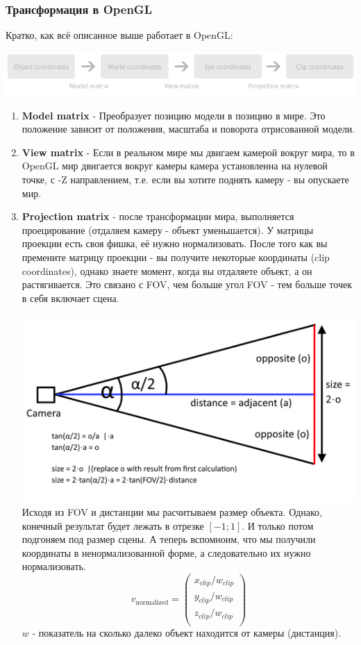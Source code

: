 \documentclass[12pt]{article}
\begin{document}
  \subsubsection{Трансформация в OpenGL}
  Кратко, как всё описанное выше работает в OpenGL:

  \includegraphics[width=\linewidth]{images/c4_transformation.png}
  \begin{enumerate}
    \item \textbf{Model matrix} - Преобразует позицию модели в позицию в мире. Это положение зависит от положения, масштаба и поворота отрисованной модели.
    \item \textbf{View matrix} - Если в реальном мире мы двигаем камерой вокруг мира, то в OpenGL мир двигается вокруг камеры
    камера установленна на нулевой точке, с -Z направлением, т.е. если вы хотите поднять камеру - вы опускаете мир. 
    \item \textbf{Projection matrix} - после трансформации мира, выполняется проецирование (отдаляем камеру - объект уменьшается).
    У матрицы проекции есть своя фишка, её нужно нормализовать. После того как вы премените матрицу проекции
    - вы получите некоторые координаты (clip coordinates), однако знаете момент, когда вы отдаляете объект, а он растягивается.
    Это связано с FOV, чем больше угол FOV - тем больше точек в себя включает сцена.
    
    \includegraphics[width=\linewidth]{images/fov.png}
    Исходя из FOV и дистанции мы расчитываем размер объекта.
    Однако, конечный результат будет лежать в отрезке $[-1;1]$.
    И только потом подгоняем под размер сцены.
    А теперь вспомноим, что мы получили координаты в ненормализованной
    форме, а следовательно их нужно нормализовать.
    $$
      v_{\text{normalized}} = \begin{pmatrix}
        x_{clip}/w_{clip} \\
        y_{clip}/w_{clip} \\
        z_{clip}/w_{clip} \\
      \end{pmatrix}
    $$
    $w$ - показатель на сколько далеко объект находится от камеры (дистанция).
  \end{enumerate}
\end{document}
